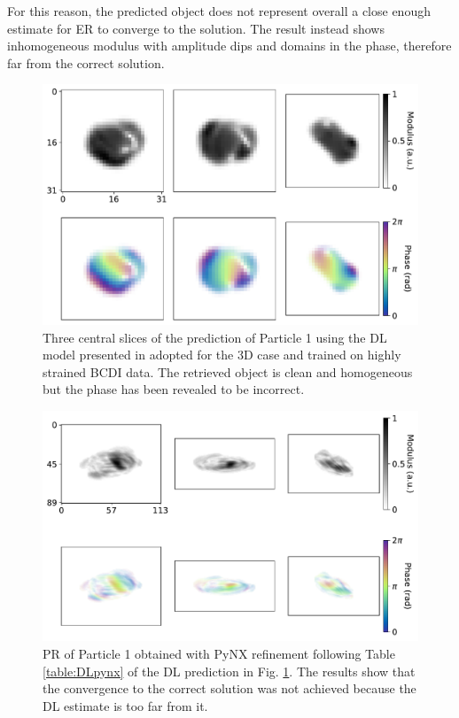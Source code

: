 For this reason, the predicted object does not represent overall a close enough estimate for ER to converge to the 
solution. The result instead shows inhomogeneous modulus with amplitude dips and domains in the phase, therefore far 
from the correct solution.  
\begin{figure}[H]
    \centering
    \includegraphics[width=\textwidth]{figures/Phasing/ian_dl_particle1.pdf}
    \caption{Three central slices of the prediction of Particle 1 using the DL model presented in \cite{yu_ultrafast_2024} 
    adopted for the 3D case and trained on highly strained BCDI data. The retrieved object is clean and homogeneous but the 
    phase has been revealed to be incorrect. }
    \label{fig:Ian_rec1}
\end{figure}

\begin{figure}[H]
    \centering
    \includegraphics[width=\textwidth]{figures/Phasing/ian_pynx_particle1.pdf}
    \caption{PR of Particle 1 obtained with PyNX refinement following Table \ref{table:DLpynx} of the DL prediction in 
    Fig. \ref{fig:Ian_rec1}. The results show that the convergence to the correct solution was not achieved because the DL
    estimate is too far from it.}
    \label{fig:Ian_pynx}
\end{figure}

